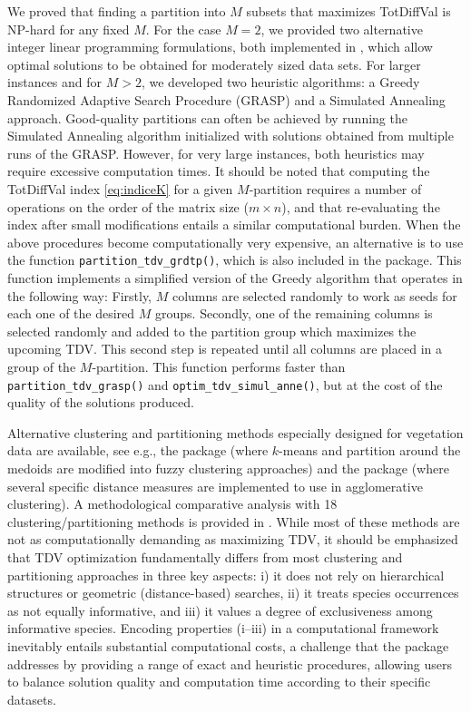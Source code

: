 We proved that finding a partition into \(M\) subsets that maximizes TotDiffVal is NP-hard for any fixed \(M\). For the case \(M=2\), we provided two alternative integer linear programming formulations, both implemented in , which allow optimal solutions to be obtained for moderately sized data sets. For larger instances and for \(M>2\), we developed two heuristic algorithms: a Greedy Randomized Adaptive Search Procedure (GRASP) and a Simulated Annealing approach. Good-quality partitions can often be achieved by running the Simulated Annealing algorithm initialized with solutions obtained from multiple runs of the GRASP. However, for very large instances, both heuristics may require excessive computation times. It should be noted that computing the TotDiffVal index \eqref{eq:indiceK} for a given \(M\)-partition requires a number of operations on the order of the matrix size (\(m\times n\)), and that re-evaluating the index after small modifications entails a similar computational burden. When the above procedures become computationally very expensive, an alternative is to use the function \texttt{partition\_tdv\_grdtp()}, which is also included in the  package. This function implements a simplified version of the Greedy algorithm that operates in the following way: Firstly, \(M\) columns are selected randomly to work as seeds for each one of the desired \(M\) groups. Secondly, one of the remaining columns is selected randomly and added to the partition group which maximizes the upcoming TDV. This second step is repeated until all columns are placed in a group of the \(M\)-partition. This function performs faster than \texttt{partition\_tdv\_grasp()} and \texttt{optim\_tdv\_simul\_anne()}, but at the cost of the quality of the solutions produced.

Alternative clustering and partitioning methods especially designed for vegetation data are available, see e.g., the  \citep{DC2025} package (where \(k\)-means and partition around the medoids are modified into fuzzy clustering approaches) and the  \citep{Oetal2025} package (where several specific distance measures are implemented to use in agglomerative clustering). A methodological comparative analysis with 18 clustering/partitioning methods is provided in \citet{MH2025}. While most of these methods are not as computationally demanding as maximizing TDV, it should be emphasized that TDV optimization fundamentally differs from most clustering and partitioning approaches in three key aspects: i) it does not rely on hierarchical structures or geometric (distance-based) searches, ii) it treats species occurrences as not equally informative, and iii) it values a degree of exclusiveness among informative species. Encoding properties (i--iii) in a computational framework inevitably entails substantial computational costs, a challenge that the  package addresses by providing a range of exact and heuristic procedures, allowing users to balance solution quality and computation time according to their specific datasets.

